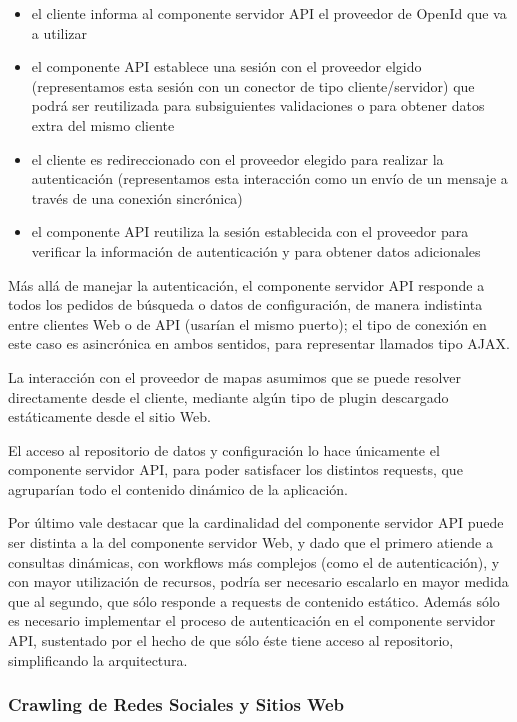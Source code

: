 \begin{itemize}
\item el cliente informa al componente servidor API el proveedor de OpenId que va a utilizar
\item el componente API establece una sesi\'on con el proveedor elgido (representamos esta sesi\'on con un conector de tipo cliente/servidor) que podr\'a ser reutilizada para subsiguientes validaciones o para obtener datos extra del mismo cliente
\item el cliente es redireccionado con el proveedor elegido para realizar la autenticaci\'on (representamos esta interacci\'on como un env\'io de un mensaje a trav\'es de una conexi\'on sincr\'onica)
\item el componente API reutiliza la sesi\'on establecida con el proveedor para verificar la informaci\'on de autenticaci\'on y para obtener datos adicionales
\end{itemize}

M\'as all\'a de manejar la autenticaci\'on, el componente servidor API responde a todos los pedidos de b\'usqueda o datos de configuraci\'on, de manera indistinta entre clientes Web o de API (usar\'ian el mismo puerto); el tipo de conexi\'on en este caso es asincr\'onica en ambos sentidos, para representar llamados tipo AJAX.

La interacci\'on con el proveedor de mapas asumimos que se puede resolver directamente desde el cliente, mediante alg\'un tipo de plugin descargado est\'aticamente desde el sitio Web.

El acceso al repositorio de datos y configuraci\'on lo hace \'unicamente el componente servidor API, para poder satisfacer los distintos requests, que agrupar\'ian todo el contenido din\'amico de la aplicaci\'on.

Por \'ultimo vale destacar que la cardinalidad del componente servidor API puede ser distinta a la del componente servidor Web, y dado que el primero atiende a consultas din\'amicas, con workflows m\'as complejos (como el de autenticaci\'on), y con mayor utilizaci\'on de recursos, podr\'ia ser necesario escalarlo en mayor medida que al segundo, que s\'olo responde a requests de contenido est\'atico. Adem\'as s\'olo es necesario implementar el proceso de autenticaci\'on en el componente servidor API, sustentado por el hecho de que s\'olo \'este tiene acceso al repositorio, simplificando la arquitectura.


\subsubsection*{Crawling de Redes Sociales y Sitios Web}


